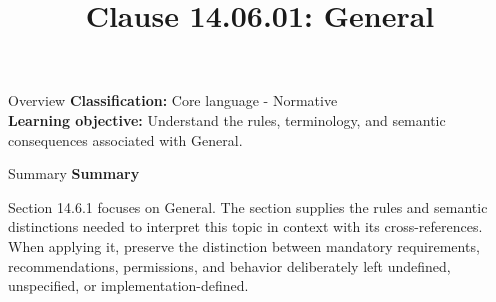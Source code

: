 \documentclass[10pt,letterpaper]{article}
\title{Clause 14.06.01: General}
\author{}
\date{}
\begin{document}
\maketitle
\begin{CornellOverviewBox}{Overview}
\textbf{Classification:} Core language - Normative\\[2pt]
\textbf{Learning objective:} Understand the rules, terminology, and semantic consequences associated with General.
\end{CornellOverviewBox}\begin{CornellSummaryBox}{Summary}
{\sffamily\bfseries\color{Accent} Summary}\par\vspace{3pt}Section 14.6.1 focuses on General. The section supplies the rules and semantic distinctions needed to interpret this topic in context with its cross-references. When applying it, preserve the distinction between mandatory requirements, recommendations, permissions, and behavior deliberately left undefined, unspecified, or implementation-defined.
\end{CornellSummaryBox}
\end{document}

